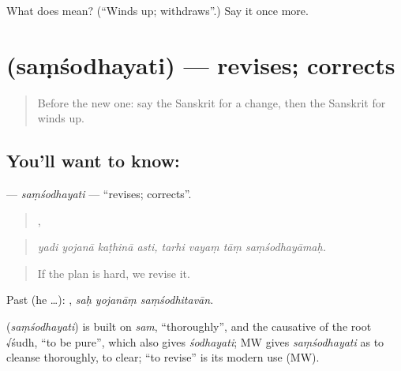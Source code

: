 \begin{tcolorbox}[breakable,colback=teal!4,colframe=teal!35!black,title={Before you move on}]
What does  mean? (\textquotedblleft{}Winds up; withdraws\textquotedblright{}.) Say it once more.
\end{tcolorbox}
\section[\texorpdfstring{\sk{संशोधयति} (saṃśodhayati)}{संशोधयति (saṃśodhayati)}]{ (saṃśodhayati) — revises; corrects}

\label{lesson:SA-C529-samsodhayati}



\begin{quote}
Before the new one: say the Sanskrit for a change, then the Sanskrit for winds up.
\end{quote}

\subsection*{You'll want to know: }
\textbf{} — \emph{saṃśodhayati} — \textquotedblleft{}revises; corrects\textquotedblright{}.

\begin{quote}
   ,    
\end{quote}

\begin{quote}
\emph{yadi yojanā kaṭhinā asti, tarhi vayaṃ tāṃ saṃśodhayāmaḥ.}
\end{quote}

\begin{quote}
If the plan is hard, we revise it.
\end{quote}

Past (he …):   , \emph{saḥ yojanāṃ saṃśodhitavān}.

\begin{cousinweb}
\textbf{} (\emph{saṃśodhayati}) is built on \emph{sam}, \textquotedblleft{}thoroughly\textquotedblright{}, and the causative of the root √śudh, \textquotedblleft{}to be pure\textquotedblright{}, which also gives \emph{śodhayati}; MW gives \emph{saṃśodhayati} as to cleanse thoroughly, to clear; \textquotedblleft{}to revise\textquotedblright{} is its modern use (MW).
\end{cousinweb}

